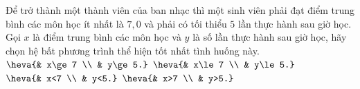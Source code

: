 \begin{ex}%
	Để trở thành một thành viên của ban nhạc thì một sinh viên phải đạt điểm trung bình các môn học ít nhất là $7{,}0$ và phải có tối thiểu $5$ lần thực hành sau giờ học. Gọi $x$ là điểm trung bình các môn học và $y$ là số lần thực hành sau giờ học, hãy chọn hệ bất phương trình thể hiện tốt nhất tình huống này.
	\def\dotEX{}
	\choice
	{\True $\heva{& x\ge 7 \\ & y\ge 5.}$}
	{$\heva{& x\le 7 \\ & y\le 5.}$}
	{$\heva{& x<7 \\ & y<5.}$}
	{$\heva{& x>7 \\ & y>5.}$}
\end{ex}

